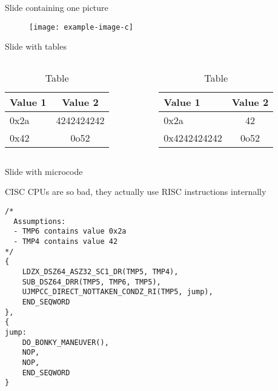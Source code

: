 \documentclass[10pt,aspectratio=1610]{beamer}
\begin{document}
\begin{frame}[fragile]{Slide containing one picture}
\begin{figure}
    \centering
    \texttt{[image: example-image-c]}
\end{figure}
\end{frame}

\begin{frame}[fragile]{Slide with tables}
    \begin{columns}
        \begin{column}{0.5\textwidth}
            \begin{table}[h!]
                \centering
                \caption{Table}
                \begin{tabular}{|l|c|}
                    \hline
                    \textbf{Value 1} & \textbf{Value 2}\\
                    \hline
                    0x2a & 4242424242 \\
                    \hline
                    0x42 & 0o52 \\
                    \hline
                \end{tabular}
            \end{table}
        \end{column}

        \begin{column}{0.5\textwidth}
            \begin{table}[h!]
                \centering
                \caption{Table}
                \begin{tabular}{|l|c|}
                    \hline
                    \textbf{Value 1} & \textbf{Value 2}\\
                    \hline
                    0x2a & 42 \\
                    \hline
                    0x4242424242 & 0o52 \\
                    \hline
                \end{tabular}
            \end{table}
        \end{column}
    \end{columns}
\end{frame}

\begin{frame}[fragile]{Slide with microcode}
\begin{center}
    CISC CPUs are so bad, they actually use RISC instructions internally
\end{center}
\begin{lstlisting}[style=uCode]
/*
  Assumptions:
  - TMP6 contains value 0x2a
  - TMP4 contains value 42
*/
{
	LDZX_DSZ64_ASZ32_SC1_DR(TMP5, TMP4),
	SUB_DSZ64_DRR(TMP5, TMP6, TMP5),
	UJMPCC_DIRECT_NOTTAKEN_CONDZ_RI(TMP5, jump),
	END_SEQWORD
},
{
jump:
	DO_BONKY_MANEUVER(),
	NOP,
	NOP,
	END_SEQWORD
}
\end{lstlisting}
\end{frame}
\end{document}
